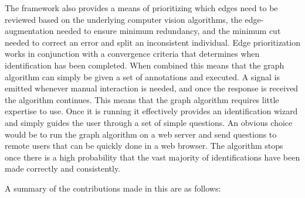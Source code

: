     The framework also provides a means of prioritizing which edges need to be reviewed based on the underlying
      computer vision algorithms, the edge-augmentation needed to ensure minimum redundancy, and the minimum cut
      needed to correct an error and split an inconsistent individual.
    Edge prioritization works in conjunction with a convergence criteria that determines when identification has
      been completed.
    When combined this means that the graph algorithm can simply be given a set of annotations and executed.
    A signal is emitted whenever manual interaction is needed, and once the response is received the algorithm
      continues.
    This means that the graph algorithm requires little expertise to use.
    Once it is running it effectively provides an identification wizard and simply guides the user through a set
      of simple questions.
    An obvious choice would be to run the graph algorithm on a web server and send questions to remote users that
      can be quickly done in a web browser.
    The algorithm stops once there is a high probability that the vast majority of identifications have been made
      correctly and consistently.


    A summary of the contributions made in this \thesis{} are as follows:

